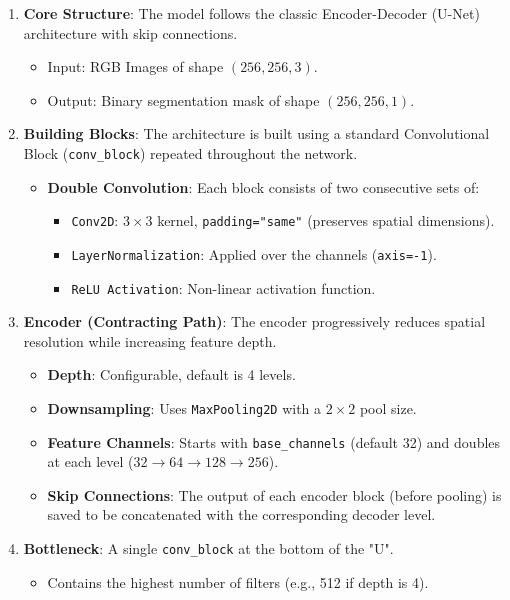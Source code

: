 \begin{enumerate}
    \item \textbf{Core Structure}: The model follows the classic Encoder-Decoder (U-Net) architecture with skip connections.
    \begin{itemize}
        \item Input: RGB Images of shape $(256, 256, 3)$.
        \item Output: Binary segmentation mask of shape $(256, 256, 1)$.
    \end{itemize}

    \item \textbf{Building Blocks}: The architecture is built using a standard Convolutional Block (\texttt{conv\_block}) repeated throughout the network.
    \begin{itemize}
        \item \textbf{Double Convolution}: Each block consists of two consecutive sets of:
        \begin{itemize}
            \item \texttt{Conv2D}: $3 \times 3$ kernel, \texttt{padding="same"} (preserves spatial dimensions).
            \item \texttt{LayerNormalization}: Applied over the channels (\texttt{axis=-1}).
            \item \texttt{ReLU Activation}: Non-linear activation function.
        \end{itemize}
    \end{itemize}

    \item \textbf{Encoder (Contracting Path)}: The encoder progressively reduces spatial resolution while increasing feature depth.
    \begin{itemize}
        \item \textbf{Depth}: Configurable, default is 4 levels.
        \item \textbf{Downsampling}: Uses \texttt{MaxPooling2D} with a $2 \times 2$ pool size.
        \item \textbf{Feature Channels}: Starts with \texttt{base\_channels} (default 32) and doubles at each level ($32 \rightarrow 64 \rightarrow 128 \rightarrow 256$).
        \item \textbf{Skip Connections}: The output of each encoder block (before pooling) is saved to be concatenated with the corresponding decoder level.
    \end{itemize}

    \item \textbf{Bottleneck}: A single \texttt{conv\_block} at the bottom of the "U".
    \begin{itemize}
        \item Contains the highest number of filters (e.g., 512 if depth is 4).
    \end{itemize}


\end{enumerate}
